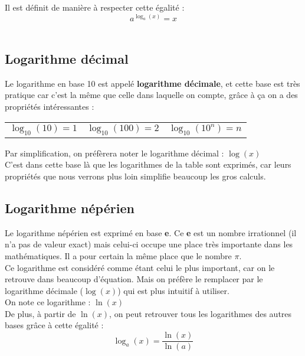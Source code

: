 \documentclass[a4paper]{article}
\begin{document}
Il est définit de manière à respecter cette égalité :
	{\LARGE $$ a ^{ \log_{a} (x)}= x $$\\}

\subsection*{Logarithme décimal}

	Le logarithme en base 10 est appelé \textbf{logarithme décimale}, et cette base est très pratique car c'est la même que celle dans laquelle on compte, grâce à ça on a des propriétés intéressantes :	
	
	\begin{center}
\begin{Large}
	\begin{tabular}{c|c|c}
	$ \log_{10} (10) = 1 $ &
	$ \log_{10} (100) = 2 $ &
	$ \log_{10} (10^{n}) = n $ \\
	\end{tabular}
\end{Large}
	\end{center}

	Par simplification, on préfèrera noter le logarithme décimal :	{\Large $ \log (x) $}\\
	
	C'est dans cette base là que les logarithmes de la table sont exprimés, car leurs propriétés que nous verrons plus loin simplifie beaucoup les gros calculs.\\

\subsection*{Logarithme népérien}

	Le logarithme népérien est exprimé en base \textbf{e}. Ce \textbf{e} est un nombre irrationnel (il n'a pas de valeur exact) mais celui-ci occupe une place très importante dans les mathématiques.  Il a pour certain la même place que le nombre $ \pi $.\\
	
	Ce logarithme est considéré comme étant celui le plus important, car on le retrouve dans beaucoup d'équation. Mais on préfère le remplacer par le logarithme décimale ($ \log (x) $) qui est plus intuitif à utiliser.\\
	
	On note ce logarithme : {\Large $ \ln (x) $}\\
	
	De plus, à partir de $ \ln (x) $, on peut retrouver tous les logarithmes des autres bases grâce à cette égalité : $$ \log_a (x) = \frac{\ln (x)}{\ln (a)} $$
\end{document}
